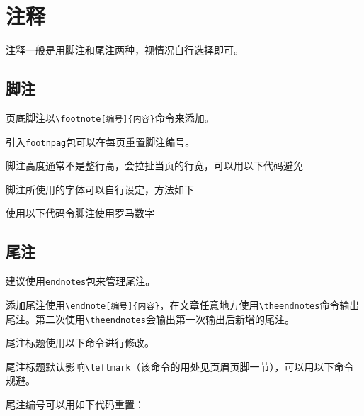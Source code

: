 \documentclass[10pt,openany]{book}
\begin{document}
\chapter{注释}

注释一般是用脚注和尾注两种，视情况自行选择即可。

\section{脚注}

页底脚注以\texttt{\textbackslash{}footnote[编号]\{内容\}}命令来添加。



引入\texttt{footnpag}包可以在每页重置脚注编号。



脚注高度通常不是整行高，会拉扯当页的行宽，可以用以下代码避免



脚注所使用的字体可以自行设定，方法如下



使用以下代码令脚注使用罗马数字



\section{尾注}

建议使用\texttt{endnotes}包来管理尾注。

添加尾注使用\texttt{\textbackslash{}endnote[编号]\{内容\}}，在文章任意地方使用\texttt{\textbackslash{}theendnotes}命令输出尾注。第二次使用\texttt{\textbackslash{}theendnotes}会输出第一次输出后新增的尾注。

尾注标题使用以下命令进行修改。



尾注标题默认影响\texttt{\textbackslash{}leftmark}（该命令的用处见页眉页脚一节），可以用以下命令规避。



尾注编号可以用如下代码重置：


\end{document}
